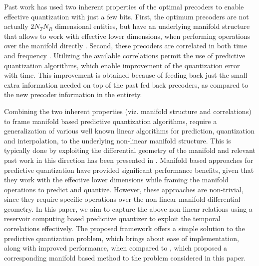 \documentclass[conference]{IEEEtran}
\begin{document}
Past work has used two inherent properties of the optimal precoders to enable effective quantization with just a few bits.
First, the optimum precoders are not actually $2N_TN_R$ dimensional entities, but have an underlying manifold structure that allows to work with effective lower dimensions, when performing operations over the manifold directly \cite{pitaval2013codebooks}.
Second, these precoders are correlated in both time and frequency \cite{Gupt1905:Predictive}.
Utilizing the available correlations permit the use of predictive quantization algorithms, which enable improvement of the quantization error with time.
This improvement is obtained because of feeding back just the small extra information needed on top of the past fed back precoders, as compared to the new precoder information in the entirety.

Combining the two inherent properties (viz. manifold structure and correlations) to frame manifold based predictive quantization algorithms, require a generalization of various well known linear algorithms for prediction, quantization and interpolation, to the underlying non-linear manifold structure. This is typically done by exploiting the differential geometry of the manifold and relevant past work in this direction has been presented in \cite{Gupt1905:Predictive,6891198,6545375,5671092,Li2016,krishnamachari2013geometry,chang2011adaptive}. Manifold based approaches for predictive quantization have provided significant performance benefits, given that they work with the effective lower dimensions while framing the manifold operations to predict and quantize.
However, these approaches are non-trivial, since they require specific operations over the non-linear manifold differential geometry.
In this paper, we aim to capture the above non-linear relations using a reservoir computing based predictive quantizer to exploit the temporal correlations effectively.
The proposed framework offers a simple solution to the predictive quantization problem, which brings about ease of implementation, along with improved performance, when compared to \cite{6891198}, which proposed a corresponding manifold based method to the problem considered in this paper.
\end{document}
